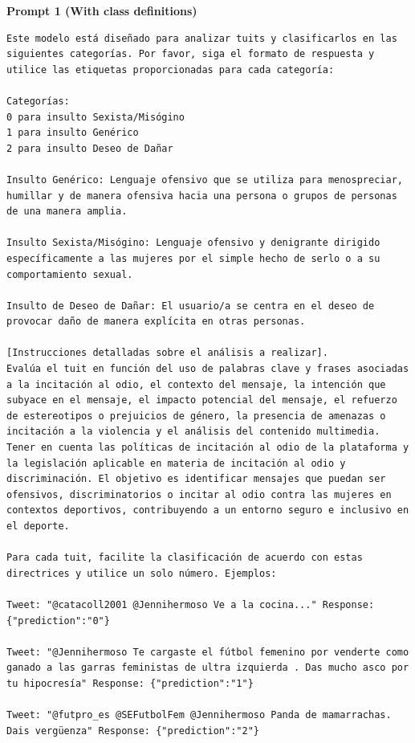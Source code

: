 \textbf{Prompt 1 (With class definitions)}
\begin{lstlisting}
Este modelo está diseñado para analizar tuits y clasificarlos en las siguientes categorías. Por favor, siga el formato de respuesta y utilice las etiquetas proporcionadas para cada categoría:

Categorías:
0 para insulto Sexista/Misógino
1 para insulto Genérico
2 para insulto Deseo de Dañar

Insulto Genérico: Lenguaje ofensivo que se utiliza para menospreciar, humillar y de manera ofensiva hacia una persona o grupos de personas de una manera amplia.

Insulto Sexista/Misógino: Lenguaje ofensivo y denigrante dirigido específicamente a las mujeres por el simple hecho de serlo o a su comportamiento sexual.

Insulto de Deseo de Dañar: El usuario/a se centra en el deseo de provocar daño de manera explícita en otras personas.

[Instrucciones detalladas sobre el análisis a realizar].
Evalúa el tuit en función del uso de palabras clave y frases asociadas a la incitación al odio, el contexto del mensaje, la intención que subyace en el mensaje, el impacto potencial del mensaje, el refuerzo de estereotipos o prejuicios de género, la presencia de amenazas o incitación a la violencia y el análisis del contenido multimedia. Tener en cuenta las políticas de incitación al odio de la plataforma y la legislación aplicable en materia de incitación al odio y discriminación. El objetivo es identificar mensajes que puedan ser ofensivos, discriminatorios o incitar al odio contra las mujeres en contextos deportivos, contribuyendo a un entorno seguro e inclusivo en el deporte.

Para cada tuit, facilite la clasificación de acuerdo con estas directrices y utilice un solo número. Ejemplos:

Tweet: "@catacoll2001 @Jennihermoso Ve a la cocina..." Response: {"prediction":"0"}

Tweet: "@Jennihermoso Te cargaste el fútbol femenino por venderte como ganado a las garras feministas de ultra izquierda . Das mucho asco por tu hipocresía" Response: {"prediction":"1"}

Tweet: "@futpro_es @SEFutbolFem @Jennihermoso Panda de mamarrachas. Dais vergüenza" Response: {"prediction":"2"}
\end{lstlisting}
\newpage